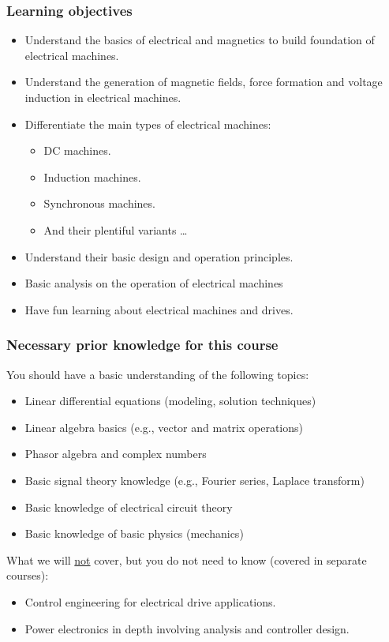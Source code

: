 \begin{frame}
	\frametitle{Learning objectives}
	\begin{itemize}
		\item Understand the basics of electrical and magnetics to build foundation of electrical machines. 
		\item Understand the generation of magnetic fields, force formation and voltage induction in electrical machines.
		\item<2-> Differentiate the main types of electrical machines:
		\begin{itemize}
			\item DC machines. 
			\item Induction machines.
			\item Synchronous machines.
			\item And their plentiful variants \ldots
		\end{itemize}
		\item<3-> Understand their basic design and operation principles.
		\item<4-> Basic analysis on the operation of electrical machines
		\item<5-> Have fun learning about electrical machines and drives.
	\end{itemize}
\end{frame}

\begin{frame}
	\frametitle{Necessary prior knowledge for this course}
	You should have a basic understanding of the following topics:
	\begin{itemize}
		\item Linear differential equations (modeling, solution techniques)
		\item Linear algebra basics (e.g., vector and matrix operations)
		\item Phasor algebra and complex numbers
		\item Basic signal theory knowledge (e.g., Fourier series, Laplace transform)
		\item Basic knowledge of electrical circuit theory
		\item Basic knowledge of basic physics (mechanics)
	\end{itemize}
	\vspace{0.5cm}
	What we will \underline{not} cover, but you do not need to know (covered in separate courses):
	\begin{itemize}
		\item Control engineering for electrical drive applications.
		\item Power electronics in depth involving analysis and controller design. 
	\end{itemize}
\end{frame}

